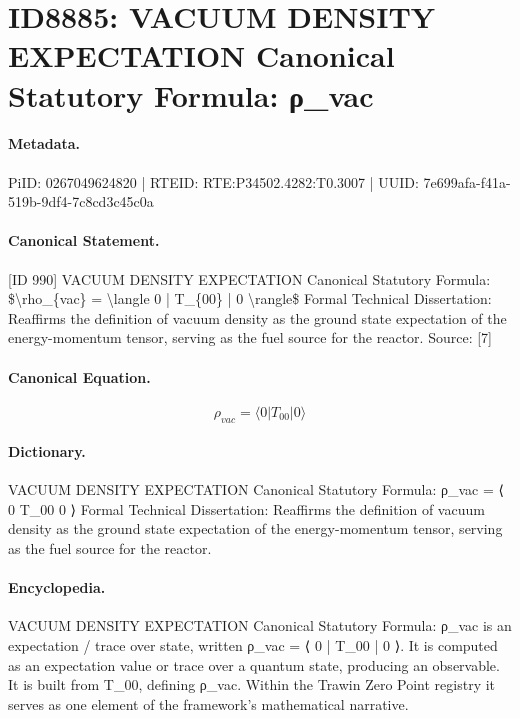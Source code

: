 \section*{ID8885: VACUUM DENSITY EXPECTATION Canonical Statutory Formula: ρ\_vac}
\paragraph{Metadata.}
PiID: 0267049624820 | RTEID: RTE:P34502.4282:T0.3007 | UUID: 7e699afa-f41a-519b-9df4-7c8cd3c45c0a

\paragraph{Canonical Statement.}
[ID 990] VACUUM DENSITY EXPECTATION Canonical Statutory Formula: \$\textbackslash{}rho\_\{vac\} = \textbackslash{}langle 0 | T\_\{00\} | 0 \textbackslash{}rangle\$ Formal Technical Dissertation: Reaffirms the definition of vacuum density as the ground state expectation of the energy-momentum tensor, serving as the fuel source for the reactor. Source: [7]

\paragraph{Canonical Equation.}
\[
\rho_{vac} = \langle 0 | T_{00} | 0 \rangle
\]

\paragraph{Dictionary.}
VACUUM DENSITY EXPECTATION Canonical Statutory Formula: ρ\_vac = ⟨ 0 T\_00 0 ⟩ Formal Technical Dissertation: Reaffirms the definition of vacuum density as the ground state expectation of the energy-momentum tensor, serving as the fuel source for the reactor.

\paragraph{Encyclopedia.}
VACUUM DENSITY EXPECTATION Canonical Statutory Formula: ρ\_vac is an expectation / trace over state, written ρ\_vac = ⟨ 0 | T\_00 | 0 ⟩. It is computed as an expectation value or trace over a quantum state, producing an observable. It is built from T\_00, defining ρ\_vac. Within the Trawin Zero Point registry it serves as one element of the framework's mathematical narrative.
